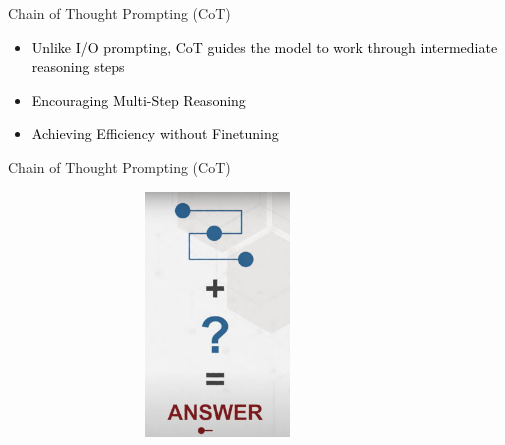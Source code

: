 \documentclass[aspectratio=169, xcolor={dvipsnames}, 10pt, brazil]{beamer}
\begin{document}
\begin{frame}{Chain of Thought Prompting (CoT)}

    \begin{itemize}
        \item \textcolor{black}{Unlike I/O prompting, CoT guides the model to work through intermediate reasoning steps}
        \item \textcolor{black}{Encouraging Multi-Step Reasoning}
         \item \textcolor{black}{Achieving Efficiency without Finetuning}
    \end{itemize}
\end{frame}
\begin{frame}{Chain of Thought Prompting (CoT)}
    \begin{figure}
        \centering
        \includegraphics[width=0.8\textwidth,height=6.5cm,keepaspectratio]{COT.png}
    \end{figure}
\end{frame}
\end{document}
